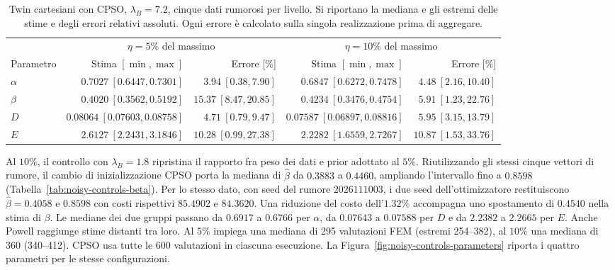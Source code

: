 \begin{table}[!tbp]
\centering\small
\caption{Twin cartesiani con CPSO, $\lambda_B=7.2$, cinque dati rumorosi per livello. Si riportano la mediana e gli estremi delle stime e degli errori relativi assoluti. Ogni errore è calcolato sulla singola realizzazione prima di aggregare.}
\label{tab:noisy-median-summary}
\setlength{\tabcolsep}{5pt}
\begin{tabular}{@{}lrrrr@{}}
\toprule
& \multicolumn{2}{c}{$\eta=5\%$ del massimo} & \multicolumn{2}{c}{$\eta=10\%$ del massimo}\\
\cmidrule(lr){2-3}\cmidrule(l){4-5}
Parametro & Stima $[\min,\max]$ & Errore [\%] & Stima $[\min,\max]$ & Errore [\%]\\
\midrule
$\alpha$ & $0.7027\ [0.6447,0.7301]$ & $3.94\ [0.38,7.90]$ & $0.6847\ [0.6272,0.7478]$ & $4.48\ [2.16,10.40]$\\
$\beta$  & $0.4020\ [0.3562,0.5192]$ & $15.37\ [8.47,20.85]$ & $0.4234\ [0.3476,0.4754]$ & $5.91\ [1.23,22.76]$\\
$D$      & $0.08064\ [0.07603,0.08758]$ & $4.71\ [0.79,9.47]$ & $0.07587\ [0.06897,0.08816]$ & $5.95\ [3.15,13.79]$\\
$E$      & $2.6127\ [2.2431,3.1846]$ & $10.28\ [0.99,27.38]$ & $2.2282\ [1.6559,2.7267]$ & $10.87\ [1.53,33.76]$\\
\bottomrule
\end{tabular}
\end{table}

Al $10\%$, il controllo con $\lambda_B=1.8$ ripristina il rapporto fra peso dei dati e prior adottato al $5\%$. Riutilizzando gli stessi cinque vettori di rumore, il cambio di inizializzazione CPSO porta la mediana di $\widehat\beta$ da $0.3883$ a $0.4460$, ampliando l'intervallo fino a $0.8598$ (Tabella~\ref{tab:noisy-controls-beta}). Per lo stesso dato, con seed del rumore $2026111003$, i due seed dell'ottimizzatore restituiscono $\widehat\beta=0.4058$ e $0.8598$ con costi rispettivi $85.4902$ e $84.3620$. Una riduzione del costo dell'$1.32\%$ accompagna uno spostamento di $0.4540$ nella stima di $\beta$. Le mediane dei due gruppi passano da $0.6917$ a $0.6766$ per $\alpha$, da $0.07643$ a $0.07588$ per $D$ e da $2.2382$ a $2.2665$ per $E$. Anche Powell raggiunge stime distanti tra loro. Al $5\%$ impiega una mediana di 295 valutazioni FEM (estremi 254--382), al $10\%$ una mediana di 360 (340--412). CPSO usa tutte le 600 valutazioni in ciascuna esecuzione. La Figura~\ref{fig:noisy-controls-parameters} riporta i quattro parametri per le stesse configurazioni.

